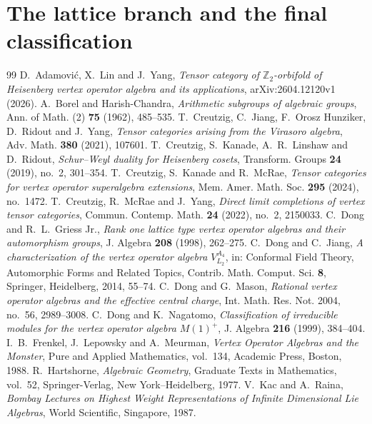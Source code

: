\documentclass[10pt,a4paper]{amsart}
\numberwithin{equation}{section} \newtheorem{thm}{Theorem}[section] \newtheorem{lem}[thm]{Lemma} \newtheorem{ex}[thm]{Example} \newtheorem{prop}[thm]{Proposition} \newtheorem{cor}[thm]{Corollary} \newtheorem{defi}[thm]{Definition} \newtheorem{rmk}[thm]{Remark} \newtheorem{notation}[thm]{Notation}
\begin{document}
\section{The lattice branch and the final classification}\label{sec:final}


\begin{thebibliography}{99}
 D.~Adamovi\'c, X.~Lin and J.~Yang, \emph{Tensor category of $\mathbb Z_2$-orbifold of Heisenberg vertex operator algebra and its applications}, arXiv:2604.12120v1 (2026).
 A.~Borel and Harish-Chandra, \emph{Arithmetic subgroups of algebraic groups}, Ann. of Math. (2) \textbf{75} (1962), 485--535.
 T.~Creutzig, C.~Jiang, F.~Orosz Hunziker, D.~Ridout and J.~Yang, \emph{Tensor categories arising from the Virasoro algebra}, Adv. Math. \textbf{380} (2021), 107601.
 T.~Creutzig, S.~Kanade, A.~R.~Linshaw and D.~Ridout, \emph{Schur--Weyl duality for Heisenberg cosets}, Transform. Groups \textbf{24} (2019), no.~2, 301--354.
 T.~Creutzig, S.~Kanade and R.~McRae, \emph{Tensor categories for vertex operator superalgebra extensions}, Mem. Amer. Math. Soc. \textbf{295} (2024), no.~1472.
 T.~Creutzig, R.~McRae and J.~Yang, \emph{Direct limit completions of vertex tensor categories}, Commun. Contemp. Math. \textbf{24} (2022), no.~2, 2150033.
 C.~Dong and R.~L.~Griess Jr., \emph{Rank one lattice type vertex operator algebras and their automorphism groups}, J. Algebra \textbf{208} (1998), 262--275.
 C.~Dong and C.~Jiang, \emph{A characterization of the vertex operator algebra $V_{L_2}^{A_4}$}, in: Conformal Field Theory, Automorphic Forms and Related Topics, Contrib. Math. Comput. Sci. \textbf{8}, Springer, Heidelberg, 2014, 55--74.
 C.~Dong and G.~Mason, \emph{Rational vertex operator algebras and the effective central charge}, Int. Math. Res. Not. 2004, no.~56, 2989--3008.
 C.~Dong and K.~Nagatomo, \emph{Classification of irreducible modules for the vertex operator algebra $M(1)^+$}, J. Algebra \textbf{216} (1999), 384--404.
 I.~B.~Frenkel, J.~Lepowsky and A.~Meurman, \emph{Vertex Operator Algebras and the Monster}, Pure and Applied Mathematics, vol.~134, Academic Press, Boston, 1988.
 R.~Hartshorne, \emph{Algebraic Geometry}, Graduate Texts in Mathematics, vol.~52, Springer-Verlag, New York--Heidelberg, 1977.
 V.~Kac and A.~Raina, \emph{Bombay Lectures on Highest Weight Representations of Infinite Dimensional Lie Algebras}, World Scientific, Singapore, 1987.

\end{thebibliography}
\end{document}
